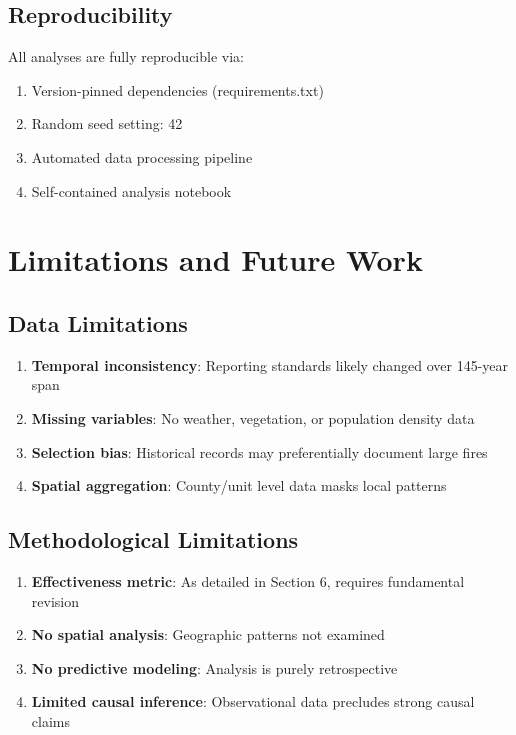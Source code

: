 \documentclass[12pt,a4paper]{article}
\begin{document}
\subsection{Reproducibility}

All analyses are fully reproducible via:
\begin{enumerate}
    \item Version-pinned dependencies (requirements.txt)
    \item Random seed setting: 42
    \item Automated data processing pipeline
    \item Self-contained analysis notebook
\end{enumerate}

\section{Limitations and Future Work}

\subsection{Data Limitations}

\begin{enumerate}
    \item \textbf{Temporal inconsistency}: Reporting standards likely changed over 145-year span
    \item \textbf{Missing variables}: No weather, vegetation, or population density data
    \item \textbf{Selection bias}: Historical records may preferentially document large fires
    \item \textbf{Spatial aggregation}: County/unit level data masks local patterns
\end{enumerate}

\subsection{Methodological Limitations}

\begin{enumerate}
    \item \textbf{Effectiveness metric}: As detailed in Section 6, requires fundamental revision
    \item \textbf{No spatial analysis}: Geographic patterns not examined
    \item \textbf{No predictive modeling}: Analysis is purely retrospective
    \item \textbf{Limited causal inference}: Observational data precludes strong causal claims
\end{enumerate}
\end{document}
